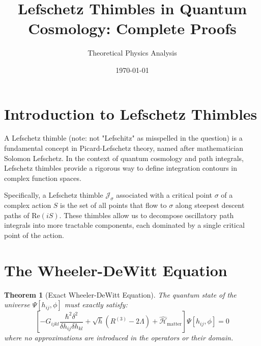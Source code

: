 \documentclass{article}
\title{Lefschetz Thimbles in Quantum Cosmology: Complete Proofs}
\author{Theoretical Physics Analysis}
\date{\today}
\newtheorem{theorem}{Theorem}
\begin{document}
\maketitle

\section{Introduction to Lefschetz Thimbles}

A Lefschetz thimble (note: not "Lefschitz" as misspelled in the question) is a fundamental concept in Picard-Lefschetz theory, named after mathematician Solomon Lefschetz. In the context of quantum cosmology and path integrals, Lefschetz thimbles provide a rigorous way to define integration contours in complex function spaces.

Specifically, a Lefschetz thimble $\mathcal{J}_\sigma$ associated with a critical point $\sigma$ of a complex action $S$ is the set of all points that flow to $\sigma$ along steepest descent paths of $\text{Re}(iS)$. These thimbles allow us to decompose oscillatory path integrals into more tractable components, each dominated by a single critical point of the action.

\section{The Wheeler-DeWitt Equation}

\begin{theorem}[Exact Wheeler-DeWitt Equation]
  The quantum state of the universe $\Psi [h_{ij}, \phi]$ must exactly
  satisfy:
  \begin{equation}
    \left[ - G_{ijkl}  \frac{\hbar^2 \delta^2}{\delta h_{ij} \delta h_{kl}} +
    \sqrt{h} (R^{(3)} - 2 \Lambda) + \hat{\mathcal{H}}_{\text{matter}} \right]
    \Psi [h_{ij}, \phi] = 0
  \end{equation}
  where no approximations are introduced in the operators or their domain.
\end{theorem}
\end{document}
